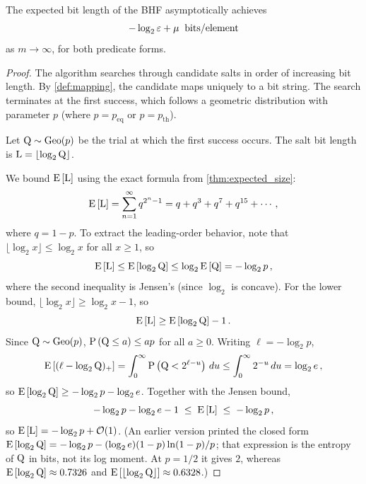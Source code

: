 \begin{theorem}
\label{thm:space}
The expected bit length of the BHF asymptotically achieves
\begin{equation}
    -\log_2 \fprate + \mu \;\; \si{bits \per element}
\end{equation}
as $m \to \infty$, for both predicate forms.
\end{theorem}
\begin{proof}
The algorithm searches through candidate salts in order of increasing bit
length.
By \cref{def:mapping}, the \nth candidate maps uniquely to a bit string.
The search terminates at the first success, which follows a geometric
distribution with parameter $p$ (where $p = p_{\mathrm{eq}}$ or
$p = p_{\mathrm{th}}$).

Let $\RV{Q} \sim \geodist(p)$ be the trial at which the first success occurs.
The salt bit length is $\RV{L} = \lfloor \log_2 \RV{Q} \rfloor$.

We bound $\Expect{\RV{L}}$ using the exact formula from
\cref{thm:expected_size}:
\begin{equation}
    \Expect{\RV{L}} = \sum_{n=1}^{\infty} q^{2^n - 1}
    = q + q^3 + q^7 + q^{15} + \cdots\,,
\end{equation}
where $q = 1 - p$.
To extract the leading-order behavior, note that
$\lfloor \log_2 x \rfloor \leq \log_2 x$ for all $x \geq 1$, so
\begin{equation}
    \Expect{\RV{L}} \leq \Expect{\log_2 \RV{Q}}
    \leq \log_2 \Expect{\RV{Q}} = -\log_2 p\,,
\end{equation}
where the second inequality is Jensen's (since $\log_2$ is concave).
For the lower bound, $\lfloor \log_2 x \rfloor \geq \log_2 x - 1$, so
\begin{equation}
    \Expect{\RV{L}} \geq \Expect{\log_2 \RV{Q}} - 1\,.
\end{equation}
Since $\RV{Q} \sim \geodist(p)$, $\Prob{\RV{Q} \leq a} \leq a p$ for all
$a \geq 0$.
Writing $\ell = -\log_2 p$,
\begin{equation}
    \Expect{(\ell - \log_2 \RV{Q})_{+}}
    = \int_0^\infty \Prob{\RV{Q} < 2^{\ell - u}}\, du
    \leq \int_0^\infty 2^{-u}\, du = \log_2 e\,,
\end{equation}
so $\Expect{\log_2 \RV{Q}} \geq -\log_2 p - \log_2 e$.
Together with the Jensen bound,
\begin{equation}
    -\log_2 p - \log_2 e - 1 \;\leq\; \Expect{\RV{L}} \;\leq\; -\log_2 p\,,
\end{equation}
so $\Expect{\RV{L}} = -\log_2 p + \mathcal{O}(1)$.
(An earlier version printed the closed form
$\Expect{\log_2 \RV{Q}} = -\log_2 p - (\log_2 e)(1 - p)\ln(1 - p)/p$; that
expression is the entropy of $\RV{Q}$ in bits, not its log moment.
At $p = 1/2$ it gives $2$, whereas $\Expect{\log_2 \RV{Q}} \approx 0.7326$ and
$\Expect{\lfloor \log_2 \RV{Q} \rfloor} \approx 0.6328$.)


\end{proof}
